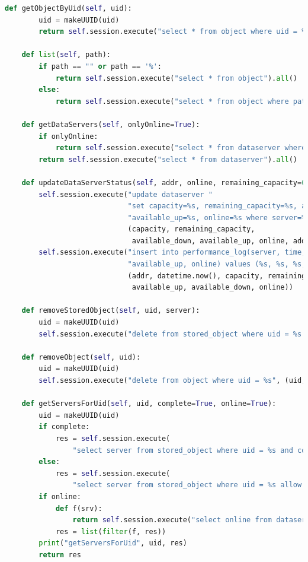 \documentclass[11pt,a4paper,english]{article}
\begin{document}
\begin{lstlisting}[language=Python, title=Codice]
    def getObjectByUid(self, uid):
        uid = makeUUID(uid)
        return self.session.execute("select * from object where uid = %s", (uid, )).one()

    def list(self, path):
        if path == "" or path == '%':
            return self.session.execute("select * from object").all()
        else:
            return self.session.execute("select * from object where path like %s", (path, )).all()

    def getDataServers(self, onlyOnline=True):
        if onlyOnline:
            return self.session.execute("select * from dataserver where online=true allow filtering").all()
        return self.session.execute("select * from dataserver").all()

    def updateDataServerStatus(self, addr, online, remaining_capacity=0, capacity=0, available_down=.0, available_up=.0):
        self.session.execute("update dataserver "
                             "set capacity=%s, remaining_capacity=%s, available_down=%s, "
                             "available_up=%s, online=%s where server=%s",
                             (capacity, remaining_capacity,
                              available_down, available_up, online, addr))
        self.session.execute("insert into performance_log(server, time, capacity, remaining_capacity, available_down,"
                             "available_up, online) values (%s, %s, %s, %s, %s, %s, %s)",
                             (addr, datetime.now(), capacity, remaining_capacity,
                              available_up, available_down, online))

    def removeStoredObject(self, uid, server):
        uid = makeUUID(uid)
        self.session.execute("delete from stored_object where uid = %s and server = %s", (uid, server))

    def removeObject(self, uid):
        uid = makeUUID(uid)
        self.session.execute("delete from object where uid = %s", (uid, ))

    def getServersForUid(self, uid, complete=True, online=True):
        uid = makeUUID(uid)
        if complete:
            res = self.session.execute(
                "select server from stored_object where uid = %s and complete = true allow filtering", (uid, )).all()
        else:
            res = self.session.execute(
                "select server from stored_object where uid = %s allow filtering", (uid, )).all()
        if online:
            def f(srv):
                return self.session.execute("select online from dataserver where server = %s", (srv.server, )).one().online
            res = list(filter(f, res))
        print("getServersForUid", uid, res)
        return res


\end{lstlisting}
\end{document}
